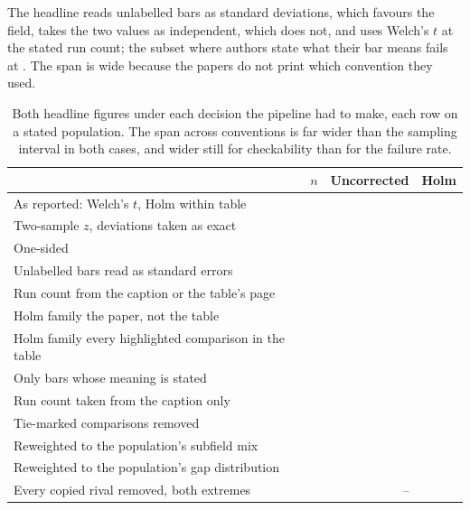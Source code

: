 \documentclass{article}
\begin{document}
The headline reads unlabelled bars as standard deviations, which favours the
field, takes the two values as independent, which does not, and uses Welch's
$t$ at the stated run count; the subset where authors state what their bar
means fails at \nLabelledOnlyFail{}. The span is wide because the papers do
not print which convention they used.

\begin{table}[t]
\centering
\caption{Both headline figures under each decision the pipeline had to make,
each row on a stated population. The span across conventions is far wider than
the sampling interval in both cases, and wider still for checkability than for
the failure rate.}
\label{tab:span}
\small
\setlength{\tabcolsep}{4pt}
\begin{tabular}{lrrr}
\toprule
& $n$ & Uncorrected & Holm \\
\midrule
As reported: Welch's $t$, Holm within table & \nSpanN{} & \nPctFail{} & \nPctFailHolm{} \\
Two-sample $z$, deviations taken as exact & \nSpanN{} & \nFailZ{} & \nFailZHolm{} \\
One-sided & \nSpanN{} & \nFailOneSided{} & \nHolmOneSided{} \\
Unlabelled bars read as standard errors & \nSpanN{} & \nUnlabelledAsSemFull{} & \nHolmUnlabelledAsSemFull{} \\
Run count from the caption or the table's page & \nLocalN{} & \nLocalFail{} & \nHolmLocal{} \\
Holm family the paper, not the table & \nSpanN{} & \nPctFail{} & \nFailHolmPaper{} \\
Holm family every highlighted comparison in the table & \nSpanN{} & \nPctFail{} & \nFailHolmAllGroups{} \\
Only bars whose meaning is stated & \nLabelledOnlyN{} & \nLabelledOnlyFail{} & \nHolmLabelledOnly{} \\
Run count taken from the caption only & \nStrictN{} & \nStrictFail{} & \nHolmStrict{} \\
Tie-marked comparisons removed & \nNExcludingTie{} & \nFailExcludingTie{} & \\
Reweighted to the population's subfield mix & \nSpanN{} & \nReweightedFail{} & \\
Reweighted to the population's gap distribution & \nSpanN{} & \nReweightedGapsFail{} & \\
Every copied rival removed, both extremes & & \nFailCopiedRemovedLow{}--\nFailCopiedRemovedHigh{} & \\

\end{tabular}
\end{table}
\end{document}
